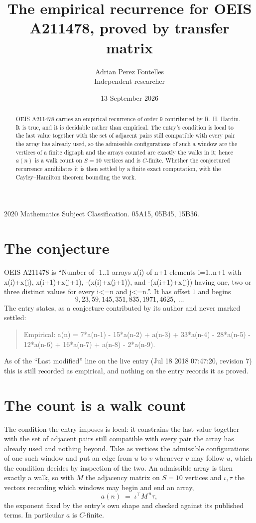 \documentclass[11pt,a4paper]{article}
\title{The empirical recurrence for OEIS A211478, proved by transfer matrix}
\author{Adrian Perez Fontelles\\ \small Independent researcher}
\date{13 September 2026}
\theoremstyle{plain}
\theoremstyle{definition}
\begin{document}
\maketitle

\begin{abstract}
OEIS A211478 carries an empirical recurrence of order $9$ contributed by R. H. Hardin. It is
true, and it is decidable rather than empirical. The entry's condition is local to the last value together with the set of adjacent pairs still compatible with every pair the array has already used, so
the admissible configurations of such a window are the vertices of a finite digraph and the
arrays counted are exactly the walks in it; hence $a(n)$ is a walk count on $S=10$ vertices
and is $C$-finite. Whether the conjectured recurrence annihilates it is then settled by a
finite exact computation, with the Cayley--Hamilton theorem bounding the work.
\end{abstract}

\noindent\small 2020 Mathematics Subject Classification. 05A15, 05B45, 15B36.\normalsize

\section{The conjecture}

OEIS A211478 is ``Number of -1..1 arrays x(i) of n+1 elements i=1..n+1 with x(i)+x(j), x(i+1)+x(j+1), -(x(i)+x(j+1)), and -(x(i+1)+x(j)) having one, two or three distinct values for every i<=n and j<=n.''. It has offset $1$ and begins
\[
9, 23, 59, 145, 351, 835, 1971, 4625,\ \dots
\]
The entry states, as a conjecture contributed by its author and never marked settled:
\begin{quote}
Empirical: a(n) = 7*a(n-1) - 15*a(n-2) + a(n-3) + 33*a(n-4) - 28*a(n-5) - 12*a(n-6) + 16*a(n-7) + a(n-8) - 2*a(n-9).
\end{quote}
As of the ``Last modified'' line on the live entry (Jul 18 2018 07:47:20, revision 7) this is still
recorded as empirical, and nothing on the entry records it as proved.

\section{The count is a walk count}

The condition the entry imposes is local: it constrains the last value together with the set of adjacent pairs still compatible with every pair the array has already used and nothing beyond. Take as
vertices the admissible configurations of one such window and put an edge from $u$ to $v$
whenever $v$ may follow $u$, which the condition decides by inspection of the two. An
admissible array is then exactly a walk, so with $M$ the adjacency matrix on $S=10$ vertices
and $\iota,\tau$ the vectors recording which windows may begin and end an array,
\[
a(n)\;=\;\iota^{\!\top}M^{\,n}\tau ,
\]
the exponent fixed by the entry's own shape and checked against its published terms. In
particular $a$ is $C$-finite.
\end{document}
